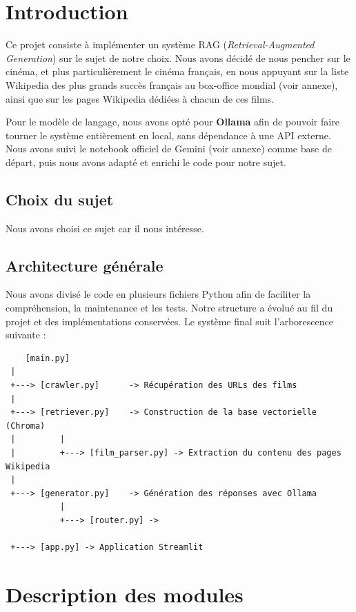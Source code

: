 \documentclass[11pt]{report}
\begin{document}
    \chapter{Introduction}
 
    Ce projet consiste à implémenter un système RAG (\textit{Retrieval-Augmented Generation}) sur le sujet de notre choix. Nous avons décidé de nous pencher sur le cinéma, et plus particulièrement le cinéma français, en nous appuyant sur la liste Wikipedia des plus grands succès français au box-office mondial (voir annexe), ainsi que sur les pages Wikipedia dédiées à chacun de ces films.

    Pour le modèle de langage, nous avons opté pour \textbf{Ollama} afin de pouvoir faire tourner le système entièrement en local, sans dépendance à une API externe. Nous avons suivi le notebook officiel de Gemini (voir annexe) comme base de départ, puis nous avons adapté et enrichi le code pour notre sujet.
    
 
    \section{Choix du sujet}
    Nous avons choisi ce sujet car il nous intéresse.
    \section{Architecture générale}
 
    Nous avons divisé le code en plusieurs fichiers Python afin de faciliter la compréhension, la maintenance et les tests. Notre structure a évolué au fil du projet et des implémentations conservées. Le système final suit l'arborescence suivante :
 
    \begin{verbatim}
    [main.py]
 |
 +---> [crawler.py]      -> Récupération des URLs des films
 |
 +---> [retriever.py]    -> Construction de la base vectorielle (Chroma)
 |         |
 |         +---> [film_parser.py] -> Extraction du contenu des pages Wikipedia
 |
 +---> [generator.py]    -> Génération des réponses avec Ollama
           |
           +---> [router.py] -> 

 +---> [app.py] -> Application Streamlit
    \end{verbatim}
    
    \chapter{Description des modules}
 
\end{document}
